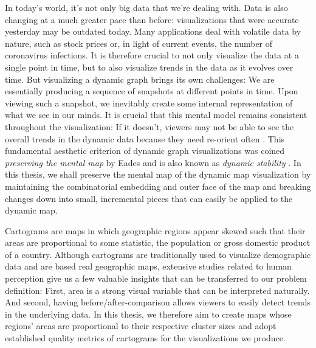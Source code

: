 In today's world, it's not only big data that we're dealing with.
Data is also changing at a much greater pace than before: visualizations that were accurate yesterday may be outdated today.
Many applications deal with volatile data by nature, such as stock prices or, in light of current events, the number of coronavirus infections.
It is therefore crucial to not only visualize the data at a single point in time, but to also visualize trends in the data as it evolves over time.
But visualizing a dynamic graph brings its own challenges:
We are essentially producing a sequence of snapshots at different points in time.
Upon viewing such a snapshot, we inevitably create some internal representation of what we see in our minds.
It is crucial that this mental model remains consistent throughout the visualization:
If it doesn't, viewers may not be able to see the overall trends in the dynamic data because they need re-orient often \cite{bohringer1990using} \cite{lee2006mental} \cite{purchase2006important}.
This fundamental aesthetic criterion of dynamic graph visualizations was coined \emph{preserving the mental map} by Eades \etal{} \cite{eades1991preserving} \cite{misue1995layout} and is also known as \emph{dynamic stability} \cite{diehl2002graphs}.
In this thesis, we shall preserve the mental map of the dynamic map visualization by maintaining the combinatorial embedding and outer face of the map and breaking changes down into small, incremental pieces that can easily be applied to the dynamic map.

Cartograms are maps in which geographic regions appear skewed such that their areas are proportional to some statistic, \eg{} the population or gross domestic product of a country.
Although cartograms are traditionally used to visualize demographic data and are based real geographic maps, extensive studies related to human perception \cite{nusrat2016state} \cite{nusrat2018evaluating} give us a few valuable insights that can be transferred to our problem definition:
First, area is a strong visual variable that can be interpreted naturally.
And second, having before/after-comparison allows viewers to easily detect trends in the underlying data.
In this thesis, we therefore aim to create maps whose regions' areas are proportional to their respective cluster sizes and adopt established quality metrics of cartograms for the visualizations we produce.


